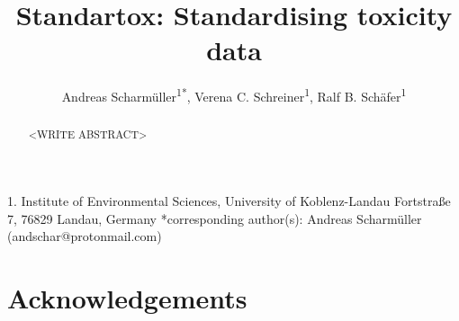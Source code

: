 \documentclass[english]{article}
\begin{document}
\title{Standartox: Standardising toxicity data}

\author{Andreas Scharm{\"u}ller\textsuperscript{1{*}},
        Verena C. Schreiner\textsuperscript{1},
        Ralf B. Sch{\"a}fer\textsuperscript{1}}

\maketitle
\thispagestyle{fancy}

1. Institute of Environmental Sciences, University of Koblenz-Landau Fortstraße 7, 76829 Landau, Germany {*}corresponding author(s):
Andreas Scharm{\"u}ller (andschar@protonmail.com)

\begin{abstract}

<WRITE ABSTRACT>

\end{abstract}
\pagebreak












 

\section*{Acknowledgements}
\end{document}
